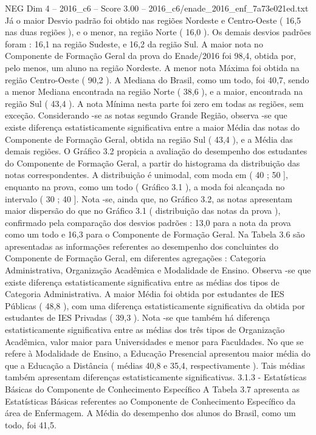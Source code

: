 \begin{textsample}{NEG Dim 4 – 2016\_c6 – Score 3.00 – 2016\_c6/enade\_2016\_enf\_7a73e021ed.txt}
Já o maior Desvio padrão foi obtido nas regiões Nordeste e Centro-Oeste ( 16,5 nas duas regiões ), e o menor, na região Norte ( 16,0 ).
Os demais desvios padrões foram : 16,1 na região Sudeste, e 16,2 da região Sul.
A maior nota no Componente de Formação Geral da prova do Enade/2016 foi 98,4, obtida por, pelo menos, um aluno na região Nordeste.
A menor nota Máxima foi obtida na região Centro-Oeste ( 90,2 ).
A Mediana do Brasil, como um todo, foi 40,7, sendo a menor Mediana encontrada na região Norte ( 38,6 ), e a maior, encontrada na região Sul ( 43,4 ).
A nota Mínima nesta parte foi zero em todas as regiões, sem exceção.
Considerando -se as notas segundo Grande Região, observa -se que existe diferença estatisticamente significativa entre a maior Média das notas do Componente de Formação Geral, obtida na região Sul ( 43,4 ), e a Média das demais regiões.
O Gráfico 3.2 propicia a avaliação do desempenho dos estudantes do Componente de Formação Geral, a partir do histograma da distribuição das notas correspondentes.
A distribuição é unimodal, com moda em ( 40 ; 50 ], enquanto na prova, como um todo ( Gráfico 3.1 ), a moda foi alcançada no intervalo ( 30 ; 40 ].
Nota -se, ainda que, no Gráfico 3.2, as notas apresentam maior dispersão do que no Gráfico 3.1 ( distribuição das notas da prova ), confirmado pela comparação dos desvios padrões : 13,0 para a nota da prova como um todo e 16,3 para o Componente de Formação Geral.
Na Tabela 3.6 são apresentadas as informações referentes ao desempenho dos concluintes do Componente de Formação Geral, em diferentes agregações : Categoria Administrativa, Organização Acadêmica e Modalidade de Ensino.
Observa -se que existe diferença estatisticamente significativa entre as médias dos tipos de Categoria Administrativa.
A maior Média foi obtida por estudantes de IES Públicas ( 48,8 ), com uma diferença estatisticamente significativa da obtida por estudantes de IES Privadas ( 39,3 ).
Nota -se que também há diferença estatisticamente significativa entre as médias dos três tipos de Organização Acadêmica, valor maior para Universidades e menor para Faculdades.
No que se refere à Modalidade de Ensino, a Educação Presencial apresentou maior média do que a Educação a Distância ( médias 40,8 e 35,4, respectivamente ).
Tais médias também apresentam diferenças estatisticamente significativas. 3.1.3 - Estatísticas Básicas do Componente de Conhecimento Específico A Tabela 3.7 apresenta as Estatísticas Básicas referentes ao Componente de Conhecimento Específico da área de Enfermagem.
A Média do desempenho dos alunos do Brasil, como um todo, foi 41,5.

\end{textsample}

